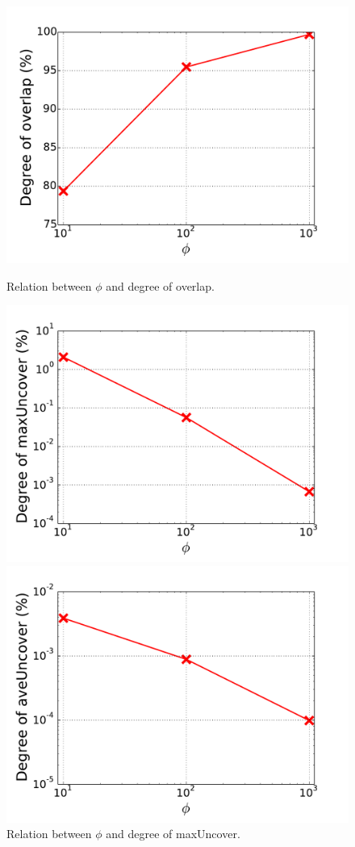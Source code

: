 \begin{figure}[!htb]
  \includegraphics[width=\linewidth]{figure/overlap.pdf}
  \caption{Relation between $\phi$ and degree of overlap.}
  \label{fig:overlap}
\endminipage\hfill
{}
  \includegraphics[width=\linewidth]{figure/maxUncover.pdf}
  \caption{Relation between $\phi$ and degree of maxUncover.}
  \label{fig:maxUncover}
\endminipage\hfill
{}%
  \includegraphics[width=\linewidth]{figure/aveUncover.pdf}

\end{figure}
